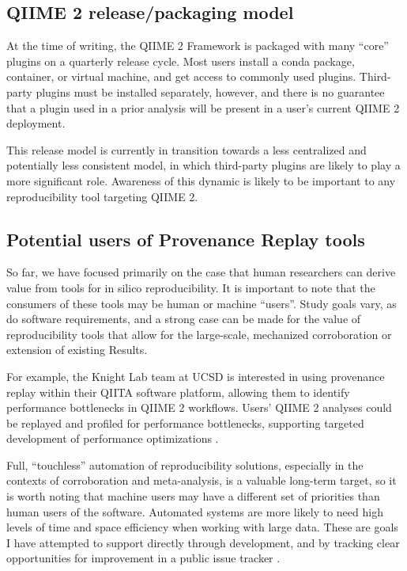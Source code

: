 \subsection{QIIME 2 release/packaging model}
At the time of writing, the QIIME 2 Framework is packaged with many “core”
plugins on a quarterly release cycle. Most users install a conda package,
container, or virtual machine, and get access to commonly used plugins.
Third-party plugins must be installed separately, however, and there is no
guarantee that a plugin used in a prior analysis will be present in a user’s
current QIIME 2 deployment.

This release model is currently in transition towards a less centralized and
potentially less consistent model, in which third-party plugins are likely to
play a more significant role. Awareness of this dynamic is likely to be
important to any reproducibility tool targeting QIIME 2.

\subsection{Potential users of Provenance Replay tools}
\label{potential_users}
So far, we have focused primarily on the case that human researchers can derive
value from tools for in silico reproducibility. It is important to note that the
consumers of these tools may be human or machine “users”. Study goals vary, as
do software requirements, and a strong case can be made for the value of
reproducibility tools that allow for the large-scale, mechanized corroboration
or extension of existing Results.

For example, the Knight Lab team at UCSD is interested in using provenance
replay within their QIITA software platform, allowing them to identify
performance bottlenecks in QIIME 2 workflows. Users' QIIME 2 analyses could be
replayed and profiled for performance bottlenecks, supporting targeted
development of performance optimizations \parencite{caporaso_nci_2022}.

Full, “touchless” automation of reproducibility solutions, especially in the
contexts of corroboration and meta-analysis, is a valuable long-term target, so
it is worth noting that machine users may have a different set of priorities
than human users of the software. Automated systems are more likely to need high
levels of time and space efficiency when working with large data. These are
goals I have attempted to support directly through development, and by tracking
clear opportunities for improvement in a public issue tracker \parencite[Issues #29,
60, 62]{keefe_issues_2021}.

